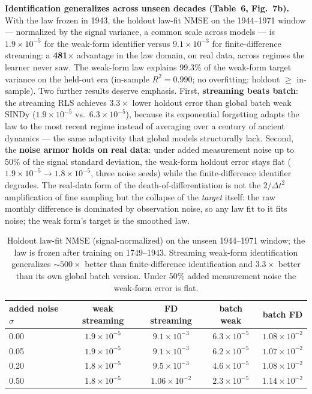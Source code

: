 \documentclass[10pt]{article}
\begin{document}
\textbf{Identification generalizes across unseen decades (Table~6, Fig.~7b).}
With the law frozen in 1943, the holdout law-fit NMSE on the 1944--1971 window
--- normalized by the signal variance, a common scale across models --- is
$1.9{\times}10^{-5}$ for the weak-form identifier versus $9.1{\times}10^{-3}$ for
finite-difference streaming: a \textbf{481$\times$} advantage in the law domain,
on real data, across regimes the learner never saw. The weak-form law explains
99.3\% of the weak-form target variance on the held-out era (in-sample
$R^2 = 0.990$; no overfitting: holdout $\geq$ in-sample). Two further results
deserve emphasis. First, \textbf{streaming beats batch}: the streaming RLS
achieves $3.3\times$ lower holdout error than global batch weak SINDy
($1.9{\times}10^{-5}$ vs.\ $6.3{\times}10^{-5}$), because its exponential forgetting
adapts the law to the most recent regime instead of averaging over a century of
ancient dynamics --- the same adaptivity that global models structurally lack.
Second, the \textbf{noise armor holds on real data}: under added measurement
noise up to 50\% of the signal standard deviation, the weak-form holdout error
stays flat ($1.9{\times}10^{-5} \to 1.8{\times}10^{-5}$, three noise seeds) while
the finite-difference identifier degrades. The real-data form of the
death-of-differentiation is not the $2/\Delta t^2$ amplification of fine sampling
but the collapse of the \emph{target} itself: the raw monthly difference is
dominated by observation noise, so any law fit to it fits noise; the weak form's
target is the smoothed law.

\begin{table}[h]
\centering\footnotesize
\caption{Holdout law-fit NMSE (signal-normalized) on the unseen 1944--1971
window; the law is frozen after training on 1749--1943. Streaming weak-form
identification generalizes ${\sim}500\times$ better than finite-difference
identification and $3.3\times$ better than its own global batch version.
Under 50\% added measurement noise the weak-form error is flat.}
\begin{tabular}{lcccc}
\toprule
added noise $\sigma$ & weak streaming & FD streaming & batch weak & batch FD \\
\midrule
0.00 & $1.9{\times}10^{-5}$ & $9.1{\times}10^{-3}$ & $6.3{\times}10^{-5}$ & $1.08{\times}10^{-2}$ \\
0.05 & $1.9{\times}10^{-5}$ & $9.1{\times}10^{-3}$ & $6.2{\times}10^{-5}$ & $1.07{\times}10^{-2}$ \\
0.20 & $1.8{\times}10^{-5}$ & $9.5{\times}10^{-3}$ & $4.6{\times}10^{-5}$ & $1.08{\times}10^{-2}$ \\
0.50 & $1.8{\times}10^{-5}$ & $1.06{\times}10^{-2}$ & $2.3{\times}10^{-5}$ & $1.14{\times}10^{-2}$ \\
\bottomrule
\end{tabular}
\end{table}
\end{document}
